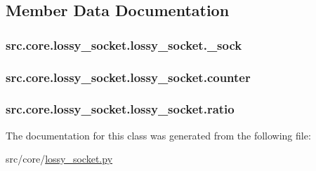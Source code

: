 \subsection{Member Data Documentation}
\hypertarget{classsrc_1_1core_1_1lossy__socket_1_1lossy__socket_a2826b858da17656697d98727c53991a0}{}
\subsubsection[{\+\_\+sock}]{\setlength{\rightskip}{0pt plus 5cm}src.\+core.\+lossy\+\_\+socket.\+lossy\+\_\+socket.\+\_\+sock\hspace{0.3cm}{\ttfamily [private]}}\label{classsrc_1_1core_1_1lossy__socket_1_1lossy__socket_a2826b858da17656697d98727c53991a0}
\hypertarget{classsrc_1_1core_1_1lossy__socket_1_1lossy__socket_a547f97977756be02b80d81b6293804fa}{}
\subsubsection[{counter}]{\setlength{\rightskip}{0pt plus 5cm}src.\+core.\+lossy\+\_\+socket.\+lossy\+\_\+socket.\+counter}\label{classsrc_1_1core_1_1lossy__socket_1_1lossy__socket_a547f97977756be02b80d81b6293804fa}
\hypertarget{classsrc_1_1core_1_1lossy__socket_1_1lossy__socket_a81b0908197756019eed96bdefbd2318a}{}
\subsubsection[{ratio}]{\setlength{\rightskip}{0pt plus 5cm}src.\+core.\+lossy\+\_\+socket.\+lossy\+\_\+socket.\+ratio}\label{classsrc_1_1core_1_1lossy__socket_1_1lossy__socket_a81b0908197756019eed96bdefbd2318a}


The documentation for this class was generated from the following file\+:\begin{DoxyCompactItemize}
\item 
src/core/\hyperlink{lossy__socket_8py}{lossy\+\_\+socket.\+py}\end{DoxyCompactItemize}
